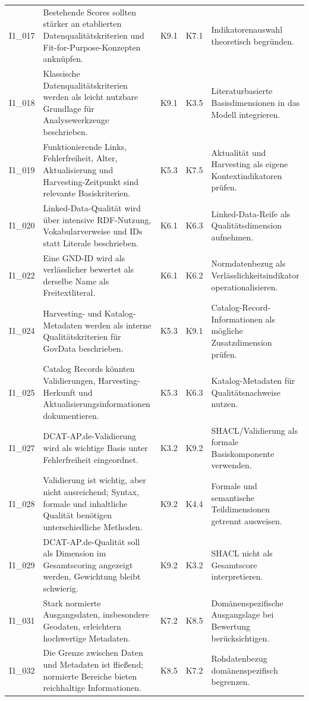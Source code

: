 \begin{longtable}{p{0.9cm} p{6cm} p{0.9cm} p{0.9cm} p{6cm}}
I1\_017 & Bestehende Scores sollten stärker an etablierten Datenqualitätskriterien und Fit-for-Purpose-Konzepten anknüpfen. & K9.1 & K7.1 & Indikatorenauswahl theoretisch begründen. \\
I1\_018 & Klassische Datenqualitätskriterien werden als leicht nutzbare Grundlage für Analysewerkzeuge beschrieben. & K9.1 & K3.5 & Literaturbasierte Basisdimensionen in das Modell integrieren. \\
I1\_019 & Funktionierende Links, Fehlerfreiheit, Alter, Aktualisierung und Harvesting-Zeitpunkt sind relevante Basiskriterien. & K5.3 & K7.5 & Aktualität und Harvesting als eigene Kontextindikatoren prüfen. \\
I1\_020 & Linked-Data-Qualität wird über intensive RDF-Nutzung, Vokabularverweise und IDs statt Literale beschrieben. & K6.1 & K6.3 & Linked-Data-Reife als Qualitätsdimension aufnehmen. \\
I1\_022 & Eine GND-ID wird als verlässlicher bewertet als derselbe Name als Freitextliteral. & K6.1 & K6.2 & Normdatenbezug als Verlässlichkeitsindikator operationalisieren. \\
I1\_024 & Harvesting- und Katalog-Metadaten werden als interne Qualitätskriterien für GovData beschrieben. & K5.3 & K9.1 & Catalog-Record-Informationen als mögliche Zusatzdimension prüfen. \\
I1\_025 & Catalog Records könnten Validierungen, Harvesting-Herkunft und Aktualisierungsinformationen dokumentieren. & K5.3 & K6.3 & Katalog-Metadaten für Qualitätsnachweise nutzen. \\
I1\_027 & DCAT-AP.de-Validierung wird als wichtige Basis unter Fehlerfreiheit eingeordnet. & K3.2 & K9.2 & SHACL/Validierung als formale Basiskomponente verwenden. \\
I1\_028 & Validierung ist wichtig, aber nicht ausreichend; Syntax, formale und inhaltliche Qualität benötigen unterschiedliche Methoden. & K9.2 & K4.4 & Formale und semantische Teildimensionen getrennt ausweisen. \\
I1\_029 & DCAT-AP.de-Qualität soll als Dimension im Gesamtscoring angezeigt werden, Gewichtung bleibt schwierig. & K9.2 & K3.2 & SHACL nicht als Gesamtscore interpretieren. \\
I1\_031 & Stark normierte Ausgangsdaten, insbesondere Geodaten, erleichtern hochwertige Metadaten. & K7.2 & K8.5 & Domänenspezifische Ausgangslage bei Bewertung berücksichtigen. \\
I1\_032 & Die Grenze zwischen Daten und Metadaten ist fließend; normierte Bereiche bieten reichhaltige Informationen. & K8.5 & K7.2 & Rohdatenbezug domänenspezifisch begrenzen. \\

\end{longtable}
